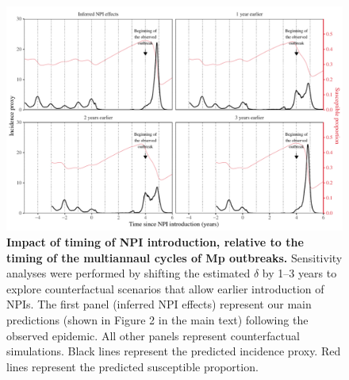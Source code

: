 \documentclass[12pt]{article}
\begin{document}
\pagebreak

\begin{figure}[!ht]
\includegraphics[width=\textwidth]{../figure3/figure3_cyclic.pdf}
\caption{
\textbf{Impact of timing of NPI introduction, relative to the timing of the multiannaul cycles of Mp outbreaks.}
Sensitivity analyses were performed by shifting the estimated $\delta$ by 1--3 years to explore counterfactual scenarios that allow earlier introduction of NPIs.
The first panel (inferred NPI effects) represent our main predictions (shown in Figure 2 in the main text) following the observed epidemic.
All other panels represent counterfactual simulations.
Black lines represent the predicted incidence proxy.
Red lines represent the predicted susceptible proportion.
}
\end{figure}

\pagebreak


\end{document}
